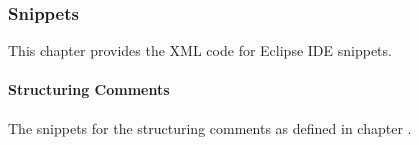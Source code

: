 
\subsubsection{Snippets}
This chapter provides the XML code for Eclipse IDE snippets.


\paragraph{Structuring Comments}\label{sec:SnippetStructuringComments}
The snippets for the structuring comments as defined in chapter .
